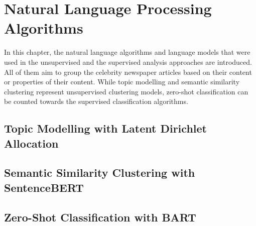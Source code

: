 \renewcommand{\imagepath}{../30-algorithms/img}

\chapter{Natural Language Processing Algorithms}
In this chapter, the natural language algorithms and language models that were used in the unsupervised and the supervised analysis approaches are introduced. All of them aim to group the celebrity newspaper articles based on their content or properties of their content. While topic modelling and semantic similarity clustering represent unsupervised clustering models, zero-shot classification can be counted towards the supervised classification algorithms.

\section{Topic Modelling with Latent Dirichlet Allocation}\label{ch:lda}
\section{Semantic Similarity Clustering with SentenceBERT}\label{ch:sentencebert}
\section{Zero-Shot Classification with BART}